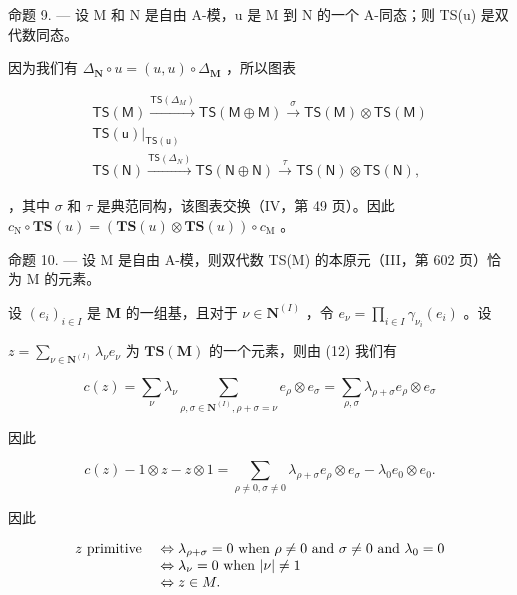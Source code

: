 命题 9. --- 设 M 和 N 是自由 A-模，u 是 M 到 N 的一个 A-同态；则 TS(u) 是双代数同态。

因为我们有 \(\Delta_{\mathbf{N}} \circ u = (u, u) \circ \Delta_{\mathbf{M}}\) ，所以图表

\[
\begin{array}{c} \mathsf {T S (M)} \xrightarrow {\mathsf {T S} (\Delta_ {M})} \mathsf {T S (M \oplus M)} \xrightarrow {\sigma} \mathsf {T S (M)} \otimes \mathsf {T S (M)} \\ \mathsf {T S (u)} \Bigg | _ {\mathsf {T S (u)}} \\ \mathsf {T S (N)} \xrightarrow {\mathsf {T S} (\Delta_ {N})} \mathsf {T S (N \oplus N)} \xrightarrow {\tau} \mathsf {T S (N)} \otimes \mathsf {T S (N)}, \end{array}
\]

，其中 \(\sigma\) 和 \(\tau\) 是典范同构，该图表交换（IV，第 49 页）。因此 \(c_{\mathrm{N}} \circ \mathbf{T}\mathbf{S}(u) = (\mathbf{T}\mathbf{S}(u) \otimes \mathbf{T}\mathbf{S}(u)) \circ c_{\mathrm{M}}\) 。

命题 10. --- 设 M 是自由 A-模，则双代数 TS(M) 的本原元（III，第 602 页）恰为 M 的元素。

设 \((e_i)_{i\in I}\) 是 \(\mathbf{M}\) 的一组基，且对于 \(\nu \in \mathbf{N}^{(I)}\) ，令 \(e_{\nu} = \prod_{i\in I}\gamma_{\nu_i}(e_i)\) 。设

\(z = \sum_{\nu \in \mathbf{N}^{(I)}} \lambda_{\nu} e_{\nu}\) 为 \(\mathbf{T}\mathbf{S}(\mathbf{M})\) 的一个元素，则由 (12) 我们有

\[
c (z) = \sum_ {\nu} \lambda_ {\nu} \sum_ {\rho , \sigma \in \mathbf {N} ^ {(I)}, \rho + \sigma = \nu} e _ {\rho} \otimes e _ {\sigma} = \sum_ {\rho , \sigma} \lambda_ {\rho + \sigma} e _ {\rho} \otimes e _ {\sigma}
\]

因此

\[
c (z) - 1 \otimes z - z \otimes 1 = \sum_ {\rho \neq 0, \sigma \neq 0} \lambda_ {\rho + \sigma} e _ {\rho} \otimes e _ {\sigma} - \lambda_ {0} e _ {0} \otimes e _ {0}.
\]

因此

\[
\begin{array}{r l} z \text {   primitive   } & \Leftrightarrow \lambda_ {\rho + \sigma} = 0 \text {   when   } \rho \neq 0 \text {   and   } \sigma \neq 0 \text {   and   } \lambda_ {0} = 0 \\ & \Leftrightarrow \lambda_ {\nu} = 0 \text {   when   } | \nu | \neq 1 \\ & \Leftrightarrow z \in M. \end{array}
\]

